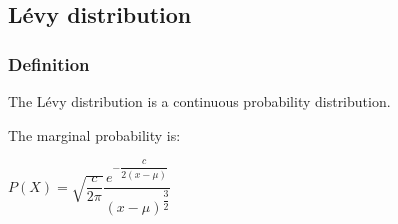 
\subsection{Lévy distribution}

\subsubsection{Definition}

The Lévy distribution is a continuous probability distribution.

The marginal probability is:

\(P(X)=\sqrt {\dfrac{c}{2\pi }}\dfrac{e^{-\dfrac{c}{2(x-\mu )}}}{(x-\mu )^{\dfrac{3}{2}}}\)

